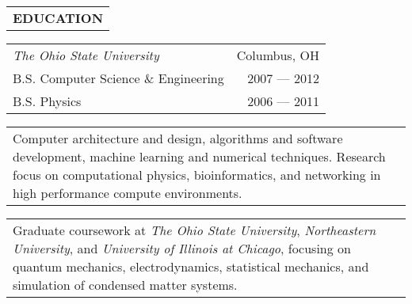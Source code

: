 \begin{tabularx}{\textwidth}{L}
    \textbf{EDUCATION}
\end{tabularx}

\begin{small}

\begin{tabularx}{\textwidth}{L R}
    \normalsize\textit{The Ohio State University} & Columbus, OH \\
    \hspace{10pt}B.S. Computer Science \& Engineering & 2007 --- 2012 \\
    \hspace{10pt}B.S. Physics & 2006 --- 2011 \\
\end{tabularx}
\begin{tabularx}{\textwidth}{X}
    \vspace{1pt}
    Computer architecture and design, algorithms and software development, machine learning and numerical techniques.
    Research focus on computational physics, bioinformatics, and networking in high performance compute environments.
\end{tabularx}
\begin{tabularx}{\textwidth}{X}
    \vspace{1pt}
    Graduate coursework at \textit{The Ohio State University}, \textit{Northeastern University}, and \textit{University of Illinois at Chicago},
    focusing on quantum mechanics, electrodynamics, statistical mechanics, and simulation of condensed matter systems.
\end{tabularx}

\end{small}
